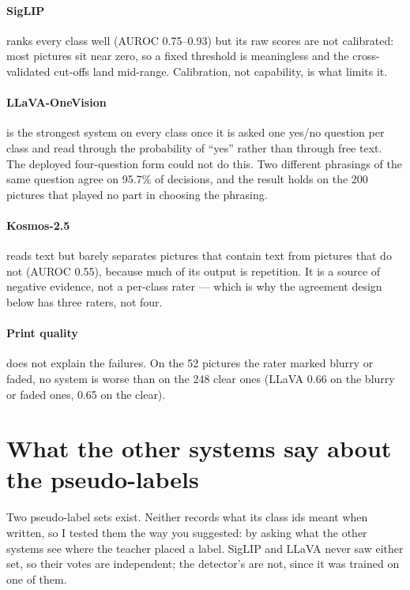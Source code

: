 \documentclass[11pt,a4paper]{article}
\begin{document}
\paragraph{SigLIP} ranks every class well (AUROC 0.75--0.93) but its raw scores are not calibrated:
most pictures sit near zero, so a fixed threshold is meaningless and the cross-validated cut-offs land
mid-range. Calibration, not capability, is what limits it.

\paragraph{LLaVA-OneVision} is the strongest system on every class once it is asked one yes/no question
per class and read through the probability of ``yes'' rather than through free text. The deployed
four-question form could not do this. Two different phrasings of the same question agree on 95.7\% of
decisions, and the result holds on the 200 pictures that played no part in choosing the phrasing.

\paragraph{Kosmos-2.5} reads text but barely separates pictures that contain text from pictures that do
not (AUROC 0.55), because much of its output is repetition. It is a source of negative evidence, not a
per-class rater --- which is why the agreement design below has three raters, not four.

\paragraph{Print quality} does not explain the failures. On the 52 pictures the rater marked blurry or
faded, no system is worse than on the 248 clear ones (LLaVA 0.66 on the blurry or faded ones, 0.65 on the clear).

\section{What the other systems say about the pseudo-labels}

Two pseudo-label sets exist. Neither records what its class ids meant when written, so I tested them
the way you suggested: by asking what the other systems see where the teacher placed a label. SigLIP
and LLaVA never saw either set, so their votes are independent; the detector's are not, since it was
trained on one of them.
\end{document}
